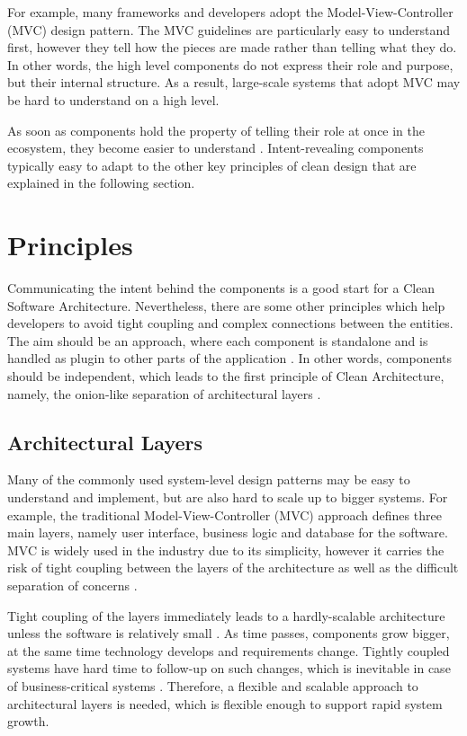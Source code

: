 \documentclass[conference]{IEEEtran}
\begin{document}
For example, many frameworks and developers adopt the Model-View-Controller (MVC) design pattern. The MVC guidelines are particularly easy to understand first, however they tell how the pieces are made rather than telling what they do. In other words, the high level components do not express their role and purpose, but their internal structure. As a result, large-scale systems that adopt MVC may be hard to understand on a high level. 

As soon as components hold the property of telling their role at once in the ecosystem, they become easier to understand \cite{cleancode}. Intent-revealing components typically easy to adapt to the other key principles of clean design that are explained in the following section.

\section{Principles}
Communicating the intent behind the components is a good start for a Clean Software Architecture. Nevertheless, there are some other principles which help developers to avoid tight coupling and complex connections between the entities. The aim should be an approach, where each component is standalone and is handled as plugin to other parts of the application \cite{cleancode} \cite{cleanarchitecture}. In other words, components should be independent, which leads to the first principle of Clean Architecture, namely, the onion-like separation of architectural layers \cite{cleanarchitecture}. 

\subsection{Architectural Layers}
Many of the commonly used system-level design patterns may be easy to understand and implement, but are also hard to scale up to bigger systems. For example, the traditional Model-View-Controller (MVC) approach defines three main layers, namely user interface, business logic and database for the software. MVC is widely used in the industry due to its simplicity, however it carries the risk of tight coupling between the layers of the architecture as well as the difficult separation of concerns \cite{onionarchitecture}. 

Tight coupling of the layers immediately leads to a hardly-scalable architecture unless the software is relatively small \cite{onionarchitecture}. As time passes, components grow bigger, at the same time technology develops and requirements change. Tightly coupled systems have hard time to follow-up on such changes, which is inevitable in case of business-critical systems \cite{onionarchitecture}. Therefore, a flexible and scalable approach to architectural layers is needed, which is flexible enough to support rapid system growth. 
\end{document}
